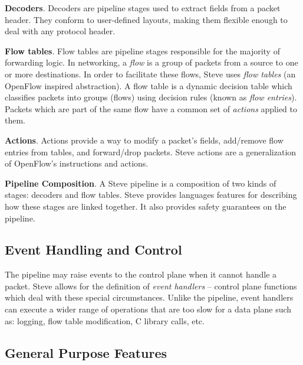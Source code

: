 \textbf{Decoders}. Decoders are pipeline stages used to extract 
fields from a packet header. 
They conform to user-defined layouts, making them flexible enough
to deal with any protocol header.

%

\textbf{Flow tables}.
Flow tables are pipeline stages responsible for the majority of forwarding logic.
In networking, a \emph{flow} is a group of packets from a source to one 
or more  destinations. In order to facilitate these flows, Steve uses \emph{flow tables} (an OpenFlow inspired abstraction). 
A flow table is a dynamic
decision table which classifies packets into groups (flows) using
decision rules (known as \emph{flow entries}).
Packets which are part of the same flow have a common set of \emph{actions}
applied to them.

\textbf{Actions}. Actions provide a way to modify a packet's fields, add/remove
flow entries from tables, and forward/drop packets. Steve actions are a
generalization
of OpenFlow's instructions and actions.

\textbf{Pipeline Composition}. A Steve pipeline is a composition of two kinds of
stages: decoders and flow tables.
Steve provides languages features for describing how these stages are linked
together. It also provides safety guarantees on the pipeline.

\subsection{Event Handling and Control}

The pipeline may raise events to the control plane when
it cannot handle a packet. Steve allows for the definition of
\emph{event handlers} -- control plane functions which deal
with these special circumstances.
Unlike the pipeline, event handlers can execute a wider range of
operations that are too slow for a data plane such as:
logging, flow table modification, C library calls, etc.

\subsection{General Purpose Features}

